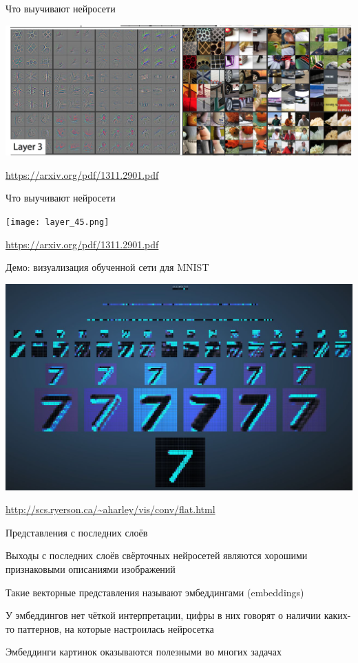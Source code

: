 \documentclass[notes,12pt, aspectratio=169]{beamer}
\newenvironment{wideitemize}{\itemize\addtolength{\itemsep}{10pt}}{\enditemize}
\begin{document}
\begin{frame}{Что выучивают нейросети}
\begin{center}
	\includegraphics[width=0.73\paperwidth]{layer_2.png}
\end{center}
\vfill
\footnotesize
{\color{blue} \url{https://arxiv.org/pdf/1311.2901.pdf}}
\end{frame}


\begin{frame}{Что выучивают нейросети}
\begin{center}
	\texttt{[image: layer\_45.png]}
\end{center}
\vfill
\footnotesize
{\color{blue} \url{https://arxiv.org/pdf/1311.2901.pdf}}
\end{frame}


\begin{frame}{Демо: визуализация обученной сети для MNIST}
\begin{center}
	\includegraphics[width=0.7\paperwidth]{mnist_demo.png}
\end{center}
\vfill
\footnotesize
{\color{blue} \url{http://scs.ryerson.ca/~aharley/vis/conv/flat.html}}
\end{frame}


\begin{frame}{Представления с последних слоёв}
\begin{wideitemize}
	\item  Выходы с последних слоёв свёрточных нейросетей являются хорошими признаковыми описаниями изображений
	\item Такие векторные представления называют \alert{эмбеддингами (embeddings)}
	\item У эмбеддингов нет чёткой интерпретации, цифры в них говорят о наличии каких-то паттернов, на которые настроилась нейросетка
	\item Эмбеддинги картинок оказываются полезными во многих задачах 
\end{wideitemize}
\end{frame}
\end{document}
